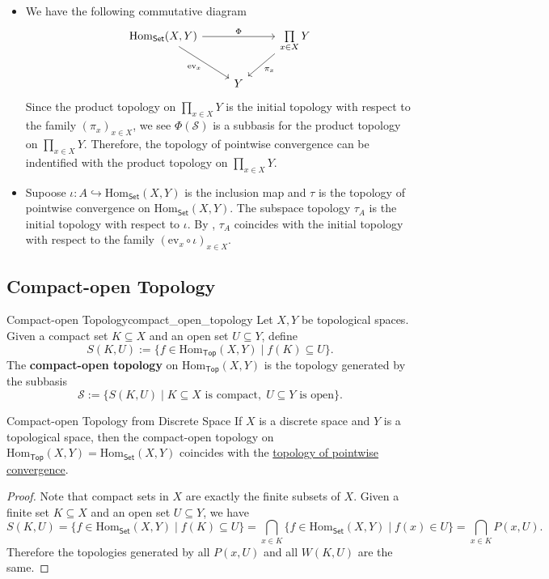 \documentclass{report}
\begin{document}
\begin{remark}
	\begin{itemize}
		\item We have the following commutative diagram
    \[
		\begin{tikzcd}
			{\mathrm{Hom}_{\mathsf{Set}}(X,Y)} \arrow[rr, "\Phi"] \arrow[rd, "\mathrm{ev}_x"'] &   & \prod\limits_{x\in X}Y \arrow[ld, "\pi_x"] \\
																							   & Y &                                           
		\end{tikzcd}
	\]
	Since the product topology on $\prod\limits_{x\in X}Y$ is the initial topology with respect to the family $\left( \pi_x \right)_{x\in X}$, we see $\Phi\left(\mathcal{S}\right)$ is a subbasis for the product topology on $\prod\limits_{x\in X}Y$. Therefore, the topology of pointwise convergence can be indentified with the product topology on $\prod\limits_{x\in X}Y$.
	  \item Supoose $\iota: A\hookrightarrow \mathrm{Hom}_{\mathsf{Set}}(X,Y)$ is the inclusion map and $\tau$ is the topology of pointwise convergence on $\mathrm{Hom}_{\mathsf{Set}}(X,Y)$. The subspace topology $\tau_A$ is the initial topology with respect to $\iota$. By , $\tau_A$ coincides with the initial topology with respect to the family $\left( \mathrm{ev}_x\circ\iota \right)_{x\in X}$.
	\end{itemize}
\end{remark}

\subsection{Compact-open Topology}

\begin{definition}{Compact-open Topology}{compact_open_topology}
	Let $X,Y$ be topological spaces. Given a compact set $K\subseteq X$ and an open set $U \subseteq Y$, define
	\[
		S(K,U):=\{f\in\mathrm{Hom}_{\mathsf{Top}}(X,Y)\mid f(K)\subseteq U\}.
	\]
	The \textbf{compact-open topology} on $\mathrm{Hom}_{\mathsf{Top}}(X,Y)$ is the topology generated by the subbasis 
	\[
		\mathcal{S}:=\{S(K,U)\mid K\subseteq X \text{ is compact},\; U\subseteq Y \text{ is open}\}.
	\]
\end{definition}

\begin{proposition}{Compact-open Topology from Discrete Space}{}
	If $X$ is a discrete space and $Y$ is a topological space, then the compact-open topology on $\mathrm{Hom}_{\mathsf{Top}}(X,Y)=\mathrm{Hom}_{\mathsf{Set}}(X,Y)$ coincides with the \hyperref[th:topology_of_pointwise_convergence]{topology of pointwise convergence}.
\end{proposition}
\begin{proof}
	Note that compact sets in $X$ are exactly the finite subsets of $X$. Given a finite set $K\subseteq X$ and an open set $U\subseteq Y$, we have
	\[
		S(K,U)=\{f\in\mathrm{Hom}_{\mathsf{Set}}(X,Y)\mid f(K)\subseteq U\}=\bigcap_{x\in K} \{f\in\mathrm{Hom}_{\mathsf{Set}}(X,Y)\mid f(x)\in U\}=\bigcap_{x\in K} P(x,U).
	\]
	Therefore the topologies generated by all $P(x,U)$ and all $W(K,U)$ are the same.
\end{proof}
\end{document}
